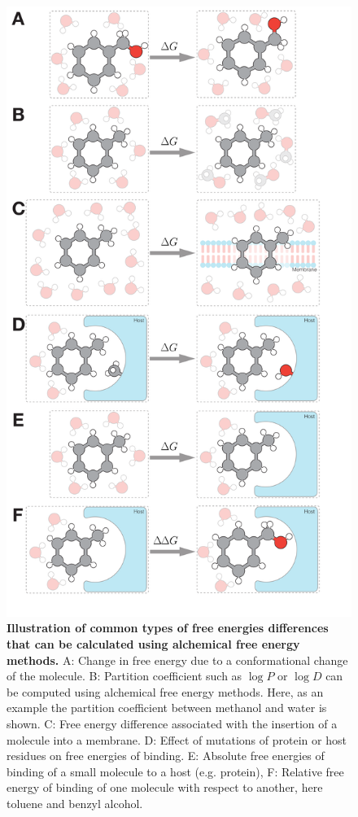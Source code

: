\documentclass[9pt,bestpractices]{livecoms}
\begin{document}
\begin{figure}
    \includegraphics[width=0.95\linewidth]{figures/fig1_what_is_alchemy/Figure.pdf}   
    \caption{\textbf{Illustration of common types of free energies differences that can be calculated using alchemical free energy methods.} A: Change in free energy due to a conformational change of the molecule. B: Partition coefficient such as $\log P$ or $\log D$ can be computed using alchemical free energy methods. Here, as an example the partition coefficient between methanol and water is shown. C: Free energy difference associated with the insertion of a molecule into a membrane. D: Effect of mutations of protein or host residues on free energies of binding.  E: Absolute free energies of binding of a small molecule to a host (e.g. protein), F: Relative free energy of binding of one molecule with respect to another, here toluene and benzyl alcohol.
    \label{fig:fig_what_is_alchemy}
    }
\end{figure}
%
\end{document}
